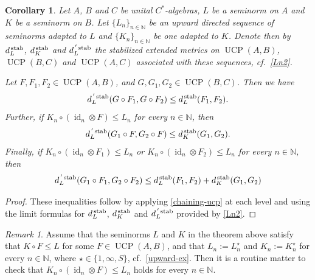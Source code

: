 \documentclass[11pt, a4paper, oneside, final, reqno]{amsart}
\newcommand{\bbN}{\mathbb{N}}
\newcommand{\UCP}{\operatorname{UCP}}
\newcommand{\id}{\operatorname{id}}
\theoremstyle{definition}
\theoremstyle{plain}
\newtheorem{corollary}[definition]{Corollary}
\theoremstyle{remark}
\newtheorem{remark}[definition]{Remark}
\numberwithin{equation}{section}
\begin{document}
\begin{corollary}\label{cor:chaining-for-pullback-metric}
    Let $A$, $B$ and $C$ be unital $C^*$-algebras, $L$ be a seminorm on $A$ and $K$ be a seminorm on $B$. Let $\{L_n\}_{n\in \bbN}$ be an upward directed sequence of seminorms adapted to $L$ and $\{K_n\}_{n\in \bbN}$ be one adapted to $K$. Denote then by $d_L^{\, \rm stab}$, $d_K^{\, \rm stab}$ and ${d}_L^{\,'\,\rm stab}$ the stabilized extended metrics on $\UCP(A, B)$, $\UCP(B, C)$ and $\UCP(A, C)$ associated with these sequences, cf.~\cref{Ln2}.
    
    Let $F, F_1, F_2 \in \UCP(A,B)$, and $G, G_1, G_2 \in \UCP(B,C)$. Then we have
    \begin{equation}\label{chaining-ucp-1}
        {d}_L^{\,'\,\rm stab}(G \circ F_1, G \circ F_2) \leq d_L^{\, \rm stab}(F_1,F_2).
    \end{equation}
    Further, if $K_n\circ (\id_n \otimes F) \leq L_n$ for every $n\in \bbN$, then
    \begin{equation}\label{chaining-ucp-2}
        {d}_L^{\,'\,\rm stab}(G_1 \circ F, G_2 \circ F) \leq d_K^{\, \rm stab}(G_1,G_2).
    \end{equation}
    Finally, if $K_n\circ (\id_n \otimes F_1) \leq L_n$ or $K_n\circ (\id_n \otimes F_2) \leq L_n$ for every $n\in \bbN$, then
    \begin{equation}\label{chaining-ucp-3}
        {d}_L^{\,'\,\rm stab}(G_1 \circ F_1, G_2 \circ F_2) \leq d_L^{\, \rm stab}(F_1,F_2) + d_K^{\, \rm stab}(G_1,G_2)
    \end{equation}
\end{corollary}
\begin{proof}
    These inequalities follow by applying \cref{chaining-ucp} at each level and using the limit formulas for $d_L^{\, \rm stab}$, $d_K^{\, \rm stab}$ and ${d}_L^{\,'\,\rm stab}$ provided by \cref{Ln2}.
\end{proof}

\begin{remark}
    Assume that the seminorms $L$ and $K$ in the theorem above satisfy that $K\circ F\leq L$ for some $F\in \UCP(A, B)$, and that $L_n:=L^\star_n$ and $K_n:=K^\star_n$ for every $n\in \bbN$, where $\star\in \{1, \infty, S\}$, cf.~\cref{upward-ex}. Then it is a routine matter to check that $K_n\circ (\id_n \otimes F) \leq L_n$ holds for every $n\in \bbN$.
\end{remark}
\end{document}
